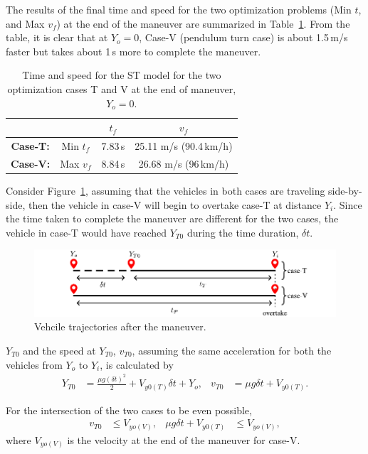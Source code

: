 The results of the final time and speed for the two optimization problems (Min $t$, and Max $v_f$) at the end of the maneuver are summarized in Table~\ref{tab:opt_res_num_pep1}. 
From the table, it is clear that at $Y_o = 0$, Case-V (pendulum turn case) is about 1.5\,m/s faster but takes about 1\,s more to complete the maneuver. 
\begin{table}[h!]
    \centering
    \begin{tabular}{c|c|c|c}
        & & $t_f$ & $v_f$\\
        \hline
        \textbf{Case-T:} & Min $t_f$ & 7.83\,s & 25.11 m/s (90.4\,km/h)\\
        \textbf{Case-V:} & Max $v_f$ & 8.84\,s & 26.68 m/s (96\,km/h)\\
    \end{tabular}
    \caption{Time and speed for the ST model for the two optimization cases T and V at the end of maneuver, $Y_o = 0$.}
    \label{tab:opt_res_num_pep1}
\end{table}

Consider Figure~\ref{fig:opt_res_num_pep1}, assuming that the vehicles in both cases are traveling side-by-side, then the vehicle in case-V will begin to overtake case-T at distance $Y_i$. Since the time taken to complete the maneuver are different for the two cases, the vehicle in case-T would have reached $Y_{T0}$ during the time duration, $\delta t$. 
\begin{figure}[h!]
    \centering
    \includegraphics{figures/pep1_analys.pdf}
    \caption{Vehcile trajectories after the maneuver.}
    \label{fig:opt_res_num_pep1}
\end{figure}

$Y_{T0}$ and the speed at $Y_{T0}$, $v_{T0}$, assuming the same acceleration for both the vehicles from $Y_o$ to $Y_i$, is calculated by
\begin{align}
    Y_{T0} &= \frac{\mu g\left(\delta t\right)^2}{2} +  V_{y0(T)}\delta t + Y_o, & v_{T0} &= \mu g\delta t +  V_{y0(T)}.
\end{align}

For the intersection of the two cases to be even possible, 
\begin{align}
    v_{T0} &\leq V_{yo(V)}, & \mu g\delta t +  V_{y0(T)} &\leq V_{yo(V)},
\end{align}
where $V_{yo(V)}$ is the velocity at the end of the maneuver for case-V. 

